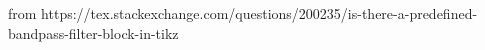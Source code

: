\documentclass{article}
\begin{document}
%
%



\vspace{5ex}
from https://tex.stackexchange.com/questions/200235/is-there-a-predefined-bandpass-filter-block-in-tikz
\end{document}

